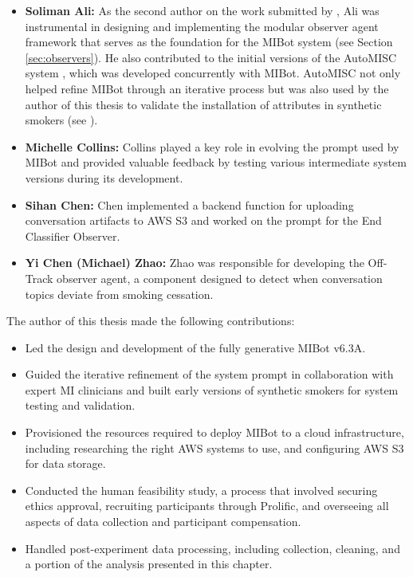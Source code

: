 \begin{itemize}
\item \textbf{Soliman Ali:} As the second author on the work submitted by \citet{mahmood-etal-2025-fully}, Ali was instrumental in designing and implementing the modular observer agent framework that serves as the foundation for the MIBot system (see Section \ref{sec:observers}). He also contributed to the initial versions of the AutoMISC system \citep{ali2025automated}, which was developed concurrently with MIBot. AutoMISC not only helped refine MIBot through an iterative process but was also used by the author of this thesis to validate the installation of attributes in synthetic smokers (see ).

\item \textbf{Michelle Collins:} Collins played a key role in evolving the prompt used by MIBot and provided valuable feedback by testing various intermediate system versions during its development.

\item \textbf{Sihan Chen:} Chen implemented a backend function for uploading conversation artifacts to AWS S3 and worked on the prompt for the End Classifier Observer.

\item \textbf{Yi Chen (Michael) Zhao:} Zhao was responsible for developing the Off-Track observer agent, a component designed to detect when conversation topics deviate from smoking cessation.
\end{itemize}

The author of this thesis made the following contributions:

\begin{itemize}
\item Led the design and development of the fully generative MIBot v6.3A.

\item Guided the iterative refinement of the system prompt in collaboration with expert MI clinicians and built early versions of synthetic smokers for system testing and validation.

\item Provisioned the resources required to deploy MIBot to a cloud infrastructure, including researching the right AWS systems to use, and configuring AWS S3 for data storage.

\item Conducted the human feasibility study, a process that involved securing ethics approval, recruiting participants through Prolific, and overseeing all aspects of data collection and participant compensation.

\item Handled post-experiment data processing, including collection, cleaning, and a portion of the analysis presented in this chapter.
\end{itemize}
